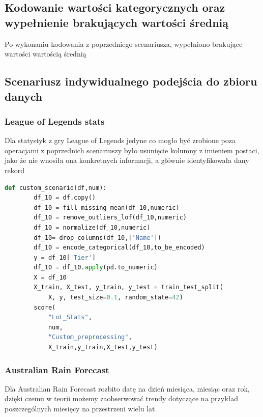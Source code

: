 \documentclass{book}
\begin{document}
\subsection{Kodowanie wartości kategorycznych oraz wypełnienie 
brakujących wartości średnią}
Po wykonaniu kodowania z poprzedniego scenariusza, 
wypełniono brakujące wartości wartością średnią
\subsection{Scenariusz indywidualnego podejścia do zbioru danych}
\subsubsection{League of Legends stats}
Dla statystyk z gry League of Legends jedyne co mogło być zrobione 
poza operacjami z poprzednich scenariuszy było usunięcie kolumny z 
imieniem postaci, jako że nie wnosiła ona konkretnych informacji, 
a głównie identyfikowała dany rekord

\begin{lstlisting}[language=Python, caption={Indywidualny 
    scenariusz dla zestawu danych LoL Stats}, captionpos=b]
    def custom_scenario(df,num):
        df_10 = df.copy()
        df_10 = fill_missing_mean(df_10,numeric)
        df_10 = remove_outliers_lof(df_10,numeric)
        df_10 = normalize(df_10,numeric)
        df_10= drop_columns(df_10,['Name'])
        df_10 = encode_categorical(df_10,to_be_encoded)
        y = df_10['Tier']
        df_10 = df_10.apply(pd.to_numeric)
        X = df_10
        X_train, X_test, y_train, y_test = train_test_split(
            X, y, test_size=0.1, random_state=42)
        score(
            "LoL_Stats",
            num,
            "Custom_preprocessing",
            X_train,y_train,X_test,y_test)
\end{lstlisting}

\subsubsection{Australian Rain Forecast}
Dla Australian Rain Forecast rozbito datę na dzień miesiąca, 
miesiąc oraz rok, dzięki czemu w teorii możemy zaobserwować 
trendy dotyczące na przykład poszczególnych miesięcy na przestrzeni 
wielu lat
\end{document}
